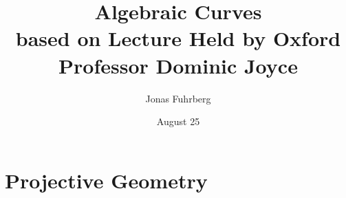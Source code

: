 \documentclass[12pt]{article}
\title{Algebraic Curves \\ \large based on Lecture Held by Oxford Professor Dominic Joyce}
\author{Jonas Fuhrberg}
\date{August 25}
\begin{document}
\maketitle
\newpage

\section*{Projective Geometry}

    
\end{document}
